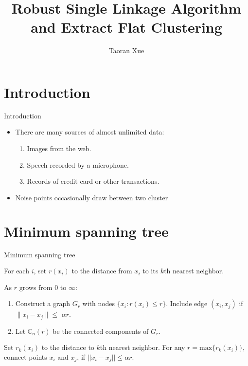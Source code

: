 \documentclass{beamer}
\title{Robust Single Linkage Algorithm and Extract Flat Clustering}
\author{Taoran Xue}
\institute{George Washington University}
\begin{document}
\begin{frame}
  \titlepage
\end{frame}



\section{Introduction}

\begin{frame}{Introduction}
\begin{itemize}
	\item There are many sources of almost unlimited data:
	\begin{enumerate}
		\item Images from the web.
		\item Speech recorded by a microphone.
		\item Records of credit card or other transactions.
	\end{enumerate}
	\item Noise points occasionally draw between two cluster
\end{itemize}

\end{frame}

\section{Minimum spanning tree}

\begin{frame}{Minimum spanning tree}

\begin{tcolorbox}
	For each $i$, set $r(x_i)$ to the distance from $x_i$ to its {\color{red}$k$}th nearest neighbor.
	
	As $r$ grows from $0$ to $\infty$:
	\begin{enumerate}
		\item Construct a graph $G_r$ with nodes $\{x_i : r(x_i) \leq r\}$. Include edge $(x_i, x_j)$ if $\|x_i - x_j\| \leq$ {\color{red}$\alpha r$}.
		\item Let $\mathbb{C}_n(r)$ be the connected components of $G_r$.
	\end{enumerate}  
	
\end{tcolorbox}


\begin{definition}
	Set $r_k(x_i)$ to the distance to $k$th nearest neighbor. For any $r = \text{max}\{r_k(x_i)\}$, connect points $x_i$ and $x_j$, if $||x_i - x_j|| \leq \alpha r$.
\end{definition}

\end{frame}
\end{document}

